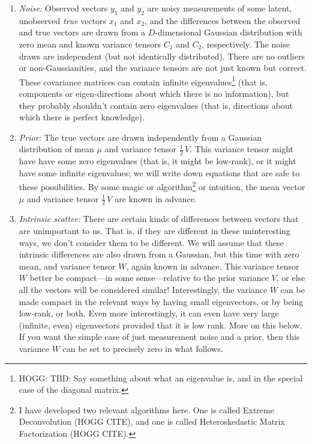 \documentclass[12pt,letterpaper]{article}
\begin{document}
\begin{enumerate}\itemsep0ex
\item \emph{Noise:} Observed vectors $y_1$ and $y_2$ are noisy
  measurements of some latent, unobserved \emph{true} vectors $x_1$
  and $x_2$, and the differences between the observed and true vectors
  are drawn from a $D$-dimensional Gaussian distribution with zero
  mean and known variance tensors $C_1$ and $C_2$, respectively. The
  noise draws are independent (but not identically distributed). There
  are no outliers or non-Gaussianities, and the variance tensors are
  not just known but correct. These covariance matrices can contain
  infinite eigenvalues\footnote{HOGG: TBD: Say something about what an eigenvalue is,
    and in the special case of the diagonal matrix.} (that is,
  components or eigen-directions about which there is no information),
  but they probably shouldn't contain zero eigenvalues (that is,
  directions about which there is perfect knowledge).
\item \emph{Prior:} The true vectors are drawn independently from a
  Gaussian distribution of mean $\mu$ and variance tensor
  $\frac{1}{2}\,V$. This variance tensor might have have some zero
  eigenvalues (that is, it might be low-rank), or it might have some
  infinite eigenvalues; we will write down equations that are safe to
  these possibilities. By some magic or algorithm\footnote{I have
    developed two relevant algorithms here. One is called Extreme
    Deconvolution (HOGG CITE), and one is called Heteroskedastic
    Matrix Factorization (HOGG CITE).} or intuition, the mean vector
  $\mu$ and variance tensor $\frac{1}{2}\,V$ are known in advance.
\item \emph{Intrinsic scatter:} There are certain kinds of differences
  between vectors that are unimportant to us. That is, if they are
  different in these uninteresting ways, we don't consider them to be
  different. We will assume that these intrinsic differences are also
  drawn from a Gaussian, but this time with zero mean, and variance
  tensor $W$, again known in advance. This variance tensor $W$ better
  be compact---in some sense---relative to the prior variance $V$, or
  else all the vectors will be considered similar! Interestingly, the
  variance $W$ can be made compact in the relevant ways by having
  small eigenvectors, or by being low-rank, or both. Even more
  interestingly, it can even have very large (infinite, even)
  eigenvectors provided that it is low rank. More on this below.
  If you want the simple case of just measurement noise and a prior,
  then this variance $W$ can be set to precisely zero in what follows.
\end{enumerate}
\end{document}

